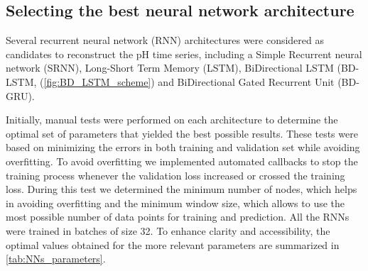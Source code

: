 \subsection{Selecting the best neural network architecture}

Several recurrent neural network (RNN) architectures were considered as
candidates to reconstruct the pH time series, including a Simple Recurrent
neural network (SRNN), Long-Short Term Memory (LSTM), BiDirectional LSTM
(BD-LSTM, (\cref{fig:BD_LSTM_scheme}) and BiDirectional Gated Recurrent Unit
(BD-GRU).

Initially, manual tests were performed on each architecture to determine
the optimal set of parameters that yielded the best possible results. These
tests were based on minimizing the errors in both training and validation set
while avoiding overfitting. To avoid overfitting we implemented automated
callbacks to stop the training process whenever the validation loss increased
or crossed the training loss. During this test we determined the minimum number
of nodes, which helps in avoiding overfitting and the minimum window size,
which allows to use the most possible number of data points for training and
prediction. All the RNNs were trained in batches of size 32. To enhance clarity
and accessibility, the optimal values obtained for the more relevant parameters
are summarized in \cref{tab:NNs_parameters}.
